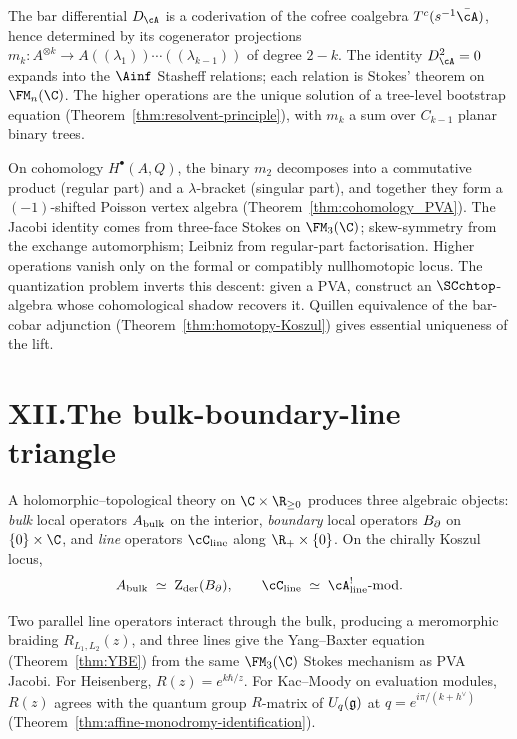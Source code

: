The bar differential $D_\cA$ is a coderivation of the cofree
coalgebra $T^c(s^{-1}\bar\cA)$, hence determined by its
cogenerator projections $m_k \colon A^{\otimes k} \to
A((\lambda_1))\cdots((\lambda_{k-1}))$ of degree $2 - k$. The
identity $D_\cA^2 = 0$ expands into the $\Ainf$ Stasheff
relations; each relation is Stokes' theorem on $\FM_n(\C)$. The
higher operations are the unique solution of a tree-level
bootstrap equation (Theorem~\ref{thm:resolvent-principle}), with
$m_k$ a sum over $C_{k-1}$ planar binary trees.

On cohomology $H^\bullet(A, Q)$, the binary $m_2$ decomposes into a
commutative product (regular
part) and a $\lambda$-bracket (singular part), and together they
form a $(-1)$-shifted Poisson vertex algebra
(Theorem~\ref{thm:cohomology_PVA}). The Jacobi identity comes
from three-face Stokes on $\FM_3(\C)$; skew-symmetry from the
exchange automorphism; Leibniz from regular-part factorisation.
Higher operations vanish only on the formal or compatibly
nullhomotopic locus.
The quantization problem inverts this descent: given a PVA,
construct an $\SCchtop$-algebra whose cohomological shadow
recovers it. Quillen equivalence of the bar-cobar adjunction
(Theorem~\ref{thm:homotopy-Koszul}) gives essential uniqueness of
the lift.

\section*{XII.\quad The bulk-boundary-line triangle}

A holomorphic--topological theory on $\C \times \R_{\ge 0}$
produces three algebraic objects: \emph{bulk} local operators
$A_{\mathrm{bulk}}$ on the interior, \emph{boundary} local operators
$B_{\partial}$ on $\{0\} \times \C$, and \emph{line} operators
$\cC_{\mathrm{line}}$ along $\R_+ \times \{0\}$. On the
chirally Koszul locus,
\[
\Abulk
\;\simeq\;
\Zder(\Bbound),
\qquad
\cC_{\mathrm{line}}
\;\simeq\;
\cA^!_{\mathrm{line}}\text{-mod}.
\]

Two parallel line operators interact through the bulk, producing
a meromorphic braiding $R_{L_1, L_2}(z)$, and three lines give
the Yang--Baxter equation (Theorem~\ref{thm:YBE}) from the same
$\FM_3(\C)$ Stokes mechanism as PVA Jacobi. For Heisenberg,
$R(z) = e^{k\hbar/z}$. For Kac--Moody on evaluation modules,
$R(z)$ agrees with the quantum group $R$-matrix of
$U_q(\mathfrak{g})$ at $q = e^{i\pi/(k+h^\vee)}$
(Theorem~\ref{thm:affine-monodromy-identification}).

